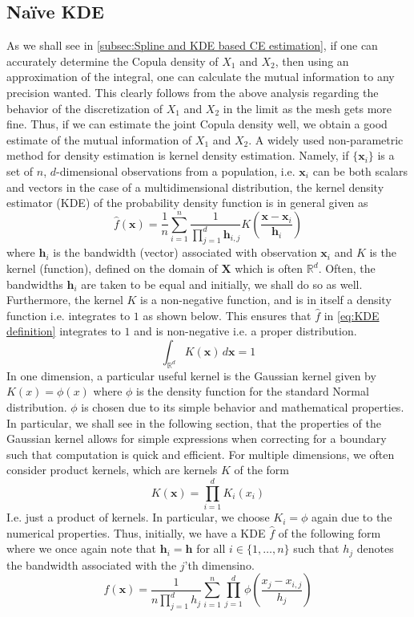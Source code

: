 \documentclass[../Thesis.tex]{subfiles}
\begin{document}
\subsection{Naïve KDE}
As we shall see in \autoref{subsec:Spline and KDE based CE estimation}, if one can accurately determine the Copula density of $X_1$ and $X_2$, then using an approximation of the integral, one can calculate the mutual information to any precision wanted. This clearly follows from the above analysis regarding the behavior of the discretization of $X_1$ and $X_2$ in the limit as the mesh gets more fine. Thus, if we can estimate the joint Copula density well, we obtain a good estimate of the mutual information of $X_1$ and $X_2$. A widely used non-parametric method for density estimation is kernel density estimation. Namely, if $\{{\boldsymbol x}_i\}$ is a set of $n$, $d$-dimensional observations from a population, i.e. $\boldsymbol x_i$ can be both scalars and vectors in the case of a multidimensional distribution, the kernel density estimator (KDE) of the probability density function is in general given as
\begin{equation}\label{eq:KDE definition}
    \hat{f}(\boldsymbol x) = \frac{1}{n}\sum_{i=1}^n \frac{1}{\prod_{j= 1}^d \boldsymbol h_{i,j}} K\left(\frac{\boldsymbol x-\boldsymbol x_i}{\boldsymbol h_i}\right)
\end{equation}
where $\boldsymbol h_i$ is the bandwidth (vector) associated with observation $\boldsymbol x_i$ and $K$ is the kernel (function), defined on the domain of $\boldsymbol X$ which is often $\mathbb{R}^d$. Often, the bandwidths $\boldsymbol h_i$ are taken to be equal and initially, we shall do so as well. Furthermore, the kernel $K$ is a non-negative function, and is in itself a density function i.e. integrates to $1$ as shown below. This ensures that $\hat{f}$ in \autoref{eq:KDE definition} integrates to $1$ and is non-negative i.e. a proper distribution.
$$\int_{\mathbb{R}^d} K(\boldsymbol x) \, d\boldsymbol x = 1$$
In one dimension, a particular useful kernel is the Gaussian kernel given by $K(x) = \phi\left(x\right)$ where $\phi$ is the density function for the standard Normal distribution. $\phi$ is chosen due to its simple behavior and mathematical properties. In particular, we shall see in the following section, that the properties of the Gaussian kernel allows for simple expressions when correcting for a boundary such that computation is quick and efficient. For multiple dimensions, we often consider product kernels, which are kernels $K$ of the form
\begin{equation}\label{eq:product kernel}
    K\left(\boldsymbol x\right) = \prod_{i = 1}^{d} K_i\left(x_i\right)
\end{equation}
I.e. just a product of kernels. In particular, we choose $K_i = \phi$ again due to the numerical properties. Thus, initially, we have a KDE $\hat{f}$ of the following form where we once again note that $\boldsymbol h_i = \boldsymbol h$ for all $i\in \{1,\dots, n\}$ such that $h_j$ denotes the bandwidth associated with the $j$'th dimensino.
$$\hat{f}\left(\boldsymbol x\right) = \frac{1}{n\prod_{j = 1}^{d}h_j} \sum_{i=1}^n \prod_{j = 1}^{d} \phi \left(\frac{x_j - x_{i,j}}{h_j}\right)$$
\end{document}

